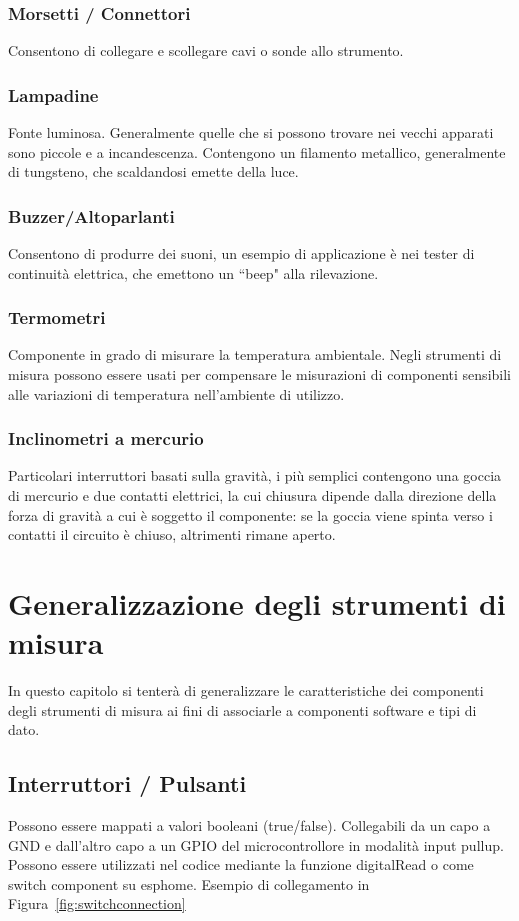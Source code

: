 \documentclass[12pt,a4paper]{report}
\begin{document}
\subsection{Morsetti / Connettori}
Consentono di collegare e scollegare cavi o sonde allo strumento.
\subsection{Lampadine}
Fonte luminosa. Generalmente quelle che si possono trovare nei vecchi apparati sono piccole e a incandescenza. Contengono un filamento
metallico, generalmente di tungsteno, che scaldandosi emette della luce.
\subsection{Buzzer/Altoparlanti}
Consentono di produrre dei suoni, un esempio di applicazione è nei tester di continuità elettrica, che emettono un ``beep" alla rilevazione.
\subsection{Termometri}
Componente in grado di misurare la temperatura ambientale. Negli strumenti di misura possono essere usati per compensare le misurazioni
di componenti sensibili alle variazioni di temperatura nell'ambiente di utilizzo.
\subsection{Inclinometri a mercurio}
Particolari interruttori basati sulla gravità, i più semplici contengono una goccia di mercurio e due contatti elettrici, la cui chiusura dipende dalla
direzione della forza di gravità a cui è soggetto il componente: se la goccia viene spinta verso i contatti il circuito è chiuso, altrimenti rimane aperto.


\chapter{Generalizzazione degli strumenti di misura}
In questo capitolo si tenterà di generalizzare le caratteristiche dei componenti degli strumenti di misura ai fini di associarle a componenti
software e tipi di dato.

\section{Interruttori / Pulsanti}
Possono essere mappati a valori booleani (true/false). Collegabili da un capo a GND e dall'altro capo a un GPIO del microcontrollore in modalità
input pullup. Possono essere utilizzati nel codice mediante la funzione digitalRead o come switch component su esphome. Esempio di collegamento
in Figura~\ref{fig:switchconnection}
\end{document}
